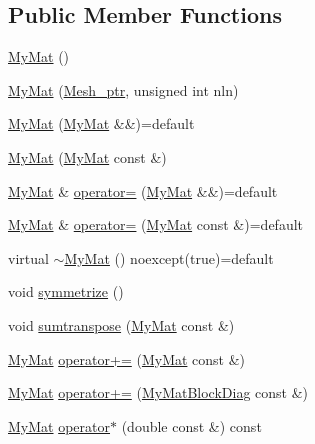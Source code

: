 \subsection*{Public Member Functions}
\begin{DoxyCompactItemize}
\item 
\hyperlink{classTspeed_1_1MyMat_a8fbd3586cb4653ea3cdb2b9d42428e85}{My\-Mat} ()
\item 
\hyperlink{classTspeed_1_1MyMat_a4f07d60d8010d796e27fb90c367b1c8a}{My\-Mat} (\hyperlink{namespaceTspeed_a7367a01365c4cc2c1a09305b3effc4e8}{Mesh\-\_\-ptr}, unsigned int nln)
\item 
\hyperlink{classTspeed_1_1MyMat_adc35adc0df81f0be813200c96c294bdc}{My\-Mat} (\hyperlink{classTspeed_1_1MyMat}{My\-Mat} \&\&)=default
\item 
\hyperlink{classTspeed_1_1MyMat_af0996d6425e454b7afb2e5f27c6b77be}{My\-Mat} (\hyperlink{classTspeed_1_1MyMat}{My\-Mat} const \&)
\item 
\hyperlink{classTspeed_1_1MyMat}{My\-Mat} \& \hyperlink{classTspeed_1_1MyMat_a1c595cc39c627f9556f7b2a3548f3da8}{operator=} (\hyperlink{classTspeed_1_1MyMat}{My\-Mat} \&\&)=default
\item 
\hyperlink{classTspeed_1_1MyMat}{My\-Mat} \& \hyperlink{classTspeed_1_1MyMat_ad9a206ca7e833b341c58424e3096641c}{operator=} (\hyperlink{classTspeed_1_1MyMat}{My\-Mat} const \&)=default
\item 
virtual \hyperlink{classTspeed_1_1MyMat_a3b10142286aebdd62af6c38eef9790e5}{$\sim$\-My\-Mat} () noexcept(true)=default
\item 
void \hyperlink{classTspeed_1_1MyMat_a32eb1340d490fc050d6c6f22a0c84a29}{symmetrize} ()
\item 
void \hyperlink{classTspeed_1_1MyMat_a565da9a269ad2afc5fcd1f358550f732}{sumtranspose} (\hyperlink{classTspeed_1_1MyMat}{My\-Mat} const \&)
\item 
\hyperlink{classTspeed_1_1MyMat}{My\-Mat} \hyperlink{classTspeed_1_1MyMat_aa9b048f523b8f2887ce3a2d578cab6b3}{operator+=} (\hyperlink{classTspeed_1_1MyMat}{My\-Mat} const \&)
\item 
\hyperlink{classTspeed_1_1MyMat}{My\-Mat} \hyperlink{classTspeed_1_1MyMat_a523a402aa8afdb2b270413b8796b0b5f}{operator+=} (\hyperlink{classTspeed_1_1MyMatBlockDiag}{My\-Mat\-Block\-Diag} const \&)
\item 
\hyperlink{classTspeed_1_1MyMat}{My\-Mat} \hyperlink{classTspeed_1_1MyMat_a8aa3f178e8723a2ac133e3debe0f4655}{operator$\ast$} (double const \&) const 
\end{DoxyCompactItemize}
